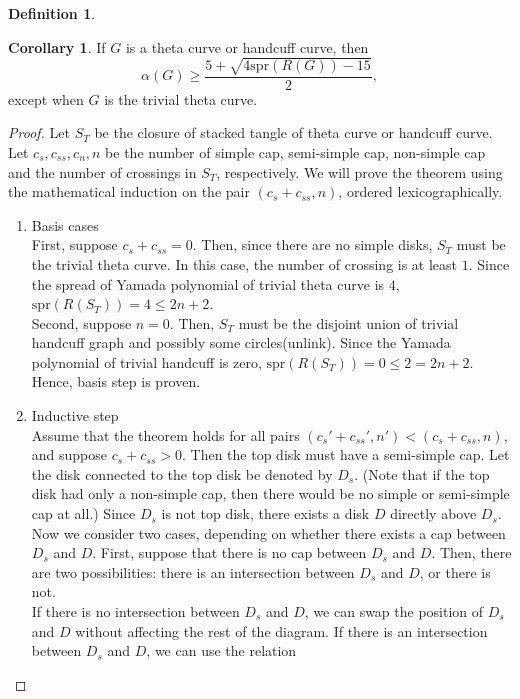 \documentclass{article}
\theoremstyle{definition}
\newtheorem{defn}[thm]{Definition}
\theoremstyle{theorem}
\theoremstyle{proposition}
\theoremstyle{corollary}
\newtheorem*{corol}{Corollary}
\begin{document}
\begin{defn}
\begin{corol}
    If $G$ is a theta curve or handcuff curve, then
    \[ \alpha(G) \geq \frac{5 + \sqrt{4 \mathrm{spr}(R(G)) - 15}}{2}, \]
    except when $G$ is the trivial theta curve.
\end{corol}

\begin{proof}
    Let $S_T$ be the closure of stacked tangle of theta curve or handcuff curve. Let $c_s, c_{ss}, c_n, n$ be the number of simple cap, semi-simple cap, non-simple cap and the number of crossings in $S_T$, respectively. We will prove the theorem using the mathematical induction on the pair $(c_s+c_{ss}, n)$, ordered lexicographically.
    \begin{enumerate}
        \item Basis cases \\
        First, suppose $c_s + c_{ss} = 0$. Then, since there are no simple disks, $S_T$ must be the trivial theta curve. In this case, the number of crossing is at least $1$. Since the spread of Yamada polynomial of trivial theta curve is $4$, $\mathrm{spr}(R(S_T)) = 4 \leq 2n+2$. \\
        Second, suppose $n = 0$. Then, $S_T$ must be the disjoint union of trivial handcuff graph and possibly some circles(unlink). Since the Yamada polynomial of trivial handcuff is zero, $\mathrm{spr}(R(S_T)) = 0 \leq 2 = 2n+2$. \\
        Hence, basis step is proven.
        
        \item Inductive step \\
        Assume that the theorem holds for all pairs $(c_s' + c_{ss}', n') < (c_s + c_{ss}, n)$, and suppose $c_s+c_{ss} > 0$. Then the top disk must have a semi-simple cap. Let the disk connected to the top disk be denoted by $D_s$. (Note that if the top disk had only a non-simple cap, then there would be no simple or semi-simple cap at all.) Since $D_s$ is not top disk, there exists a disk $D$ directly above $D_s$. Now we consider two cases, depending on whether there exists a cap between $D_s$ and $D$. First, suppose that there is no cap between $D_s$ and $D$. Then, there are two possibilities: there is an intersection between $D_s$ and $D$, or there is not. \\
        If there is no intersection between $D_s$ and $D$, we can swap the position of $D_s$ and $D$ without affecting the rest of the diagram. If there is an intersection between $D_s$ and $D$, we can use the relation


\end{enumerate}
\end{proof}
\end{defn}
\end{document}
